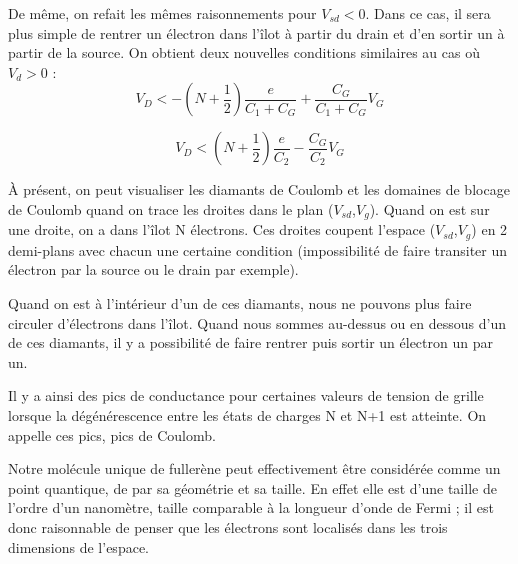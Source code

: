 De même, on refait les mêmes raisonnements pour $V_{sd}<0$. Dans ce cas, il sera plus simple de rentrer un électron dans l'îlot à partir du drain et d'en sortir un à partir de la source. On obtient deux nouvelles conditions similaires au cas où  $V_{d}>0$ :
\[V_D < - (N + \frac{1}{2})\frac{e}{C_1 + C_G} + \frac{C_G}{C_1 + C_G}V_G\]

\[V_D < (N + \frac{1}{2})\frac{e}{C_2} - \frac{C_G}{C_2}V_G\]

À présent, on peut visualiser les diamants de Coulomb et les domaines de blocage de Coulomb quand on trace les droites dans le plan ($V_{sd}$,$V_{g}$). Quand on est sur une droite, on a dans l'îlot N électrons. Ces droites coupent l'espace ($V_{sd}$,$V_{g}$) en 2 demi-plans avec chacun une certaine condition (impossibilité de faire transiter un électron par la source ou le drain par exemple).
\begin{figure}[h]
    \begin{center}
        \caption{}
        \label{fig:}
    \end{center}
\end{figure}

Quand on est à l'intérieur d'un de ces diamants, nous ne pouvons plus faire circuler d'électrons dans l'îlot. Quand nous sommes au-dessus ou en dessous d'un de ces diamants, il y a possibilité de faire rentrer puis sortir un électron un par un.

Il y a ainsi des pics de conductance pour certaines valeurs de tension de grille lorsque la dégénérescence entre les états de charges N et N+1 est atteinte. On appelle ces pics, pics de Coulomb.

Notre molécule unique de fullerène peut effectivement être considérée comme un point quantique, de par sa géométrie et sa taille. En effet elle est d'une taille de l'ordre d'un nanomètre, taille comparable à la longueur d'onde de Fermi ; il est donc raisonnable de penser que les électrons sont localisés dans les trois dimensions de l'espace.
